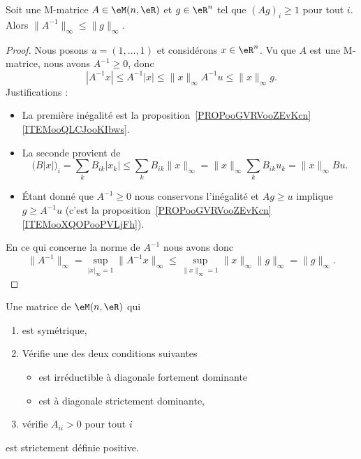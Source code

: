 \begin{theorem} \label{THOooWIFGooBQpddF}
	Soit une M-matrice \( A\in \eM(n,\eR)\) et \( g\in \eR^n\) tel que \( (Ag)_i\geq 1\) pour tout \( i\). Alors \( \| A^{-1} \|_{\infty}\leq \| g \|_{\infty}\).
\end{theorem}

\begin{proof}
	Nous posons  \( u=(1,\ldots, 1)\) et considérons \( x\in \eR^n\). Vu que \( A\) est une M-matrice, nous avons \( A^{-1}\geq 0\), donc
	\begin{equation}
		| A^{-1} x |\leq A^{-1}| x |\leq \| x \|_{\infty}A^{-1}u\leq \| x \|_{\infty}g.
	\end{equation}
	Justifications :
	\begin{itemize}
		\item La première inégalité est la proposition~\ref{PROPooGVRVooZEvKcn}\ref{ITEMooQLCJooKIbws}.
		\item La seconde provient de
		      \begin{equation}
			      \big( B| x | \big)_i=\sum_kB_{ik}| x_k |\leq\sum_kB_{ik}\| x \|_{\infty}=\| x \|_{\infty}\sum_{k}B_{ik}u_k=\| x \|_{\infty}Bu.
		      \end{equation}
		\item
		      Étant donné que \( A^{-1}\geq 0\) nous conservons l'inégalité et \( Ag\geq u\) implique \( g\geq A^{-1}u\) (c'est la proposition~\ref{PROPooGVRVooZEvKcn}\ref{ITEMooXQOPooPVLjFh}).
	\end{itemize}

	En ce qui concerne la norme de \( A^{-1}\) nous avons donc
	\begin{equation}
		\| A^{-1} \|_{\infty}=\sup_{| x |_{\infty}=1}\| A^{-1}x \|_{\infty}\leq \sup_{\| x \|_{\infty}=1}\| x \|_{\infty}\| g \|_{\infty}=\| g \|_{\infty}.
	\end{equation}
\end{proof}

\begin{proposition}     \label{PROPooQBWQooBbeZLO}
	Une matrice de \( \eM(n,\eR)\) qui
	\begin{enumerate}
		\item est symétrique,
		\item
		      Vérifie une des deux conditions suivantes
		      \begin{itemize}
			      \item
			            est irréductible à diagonale fortement dominante
			      \item
			            est à diagonale strictement dominante,
		      \end{itemize}
		\item vérifie \( A_{ii}>0\) pour tout \( i\)
	\end{enumerate}
	est strictement définie positive.
\end{proposition}

